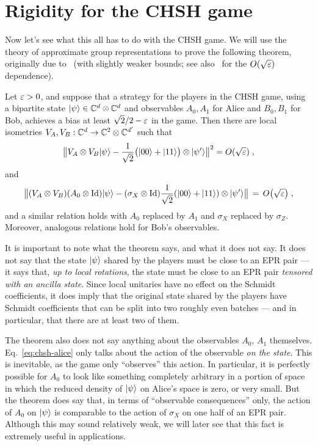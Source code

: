\section{Rigidity for the CHSH game}

Now let's see what this all has to do with the CHSH game. We will use the theory of approximate group representations to prove the following theorem, originally due to~\cite{summers1988maximal} (with slightly weaker bounds; see also~\cite{mckague2012robust} for the $O(\sqrt{\varepsilon})$ dependence).

\begin{theorem}\label{thm:rigid-chsh}
Let $\varepsilon>0$, and suppose that a strategy for the players  in the CHSH game, using  a bipartite state $|\psi\rangle\in\mathbb{C}^d\otimes \mathbb{C}^d$ and observables $A_0,A_1$ for Alice and $B_0,B_1$ for Bob, achieves a bias at least $\sqrt{2}/2-\varepsilon$ in the game. Then there are local isometries $V_A,V_B:\mathbb{C}^d \to \mathbb{C}^2 \otimes \mathbb{C}^{d'}$ such that 
\begin{equation}\label{eq:chsh-state}
\big\| V_A \otimes V_B |\psi\rangle - \frac{1}{\sqrt{2}}\big(|00\rangle+|11\rangle\big) \otimes |\psi'\rangle \big\|^2 = O(\sqrt{\varepsilon}) \;,
\end{equation}
and 
\begin{equation}\label{eq:chsh-alice}
\big\|( V_A \otimes V_B)( A_0 \otimes \mathop{\rm Id}\nolimits )|\psi\rangle - (\sigma_X \otimes \mathop{\rm Id}\nolimits)\frac{1}{\sqrt{2}}(|00\rangle+|11\rangle) \otimes |\psi'\rangle \big\| \,=\, O\big(\sqrt{\varepsilon}\big)\;,
\end{equation}
and a similar relation holds with $A_0$ replaced by $A_1$ and $\sigma_X$ replaced by $\sigma_Z$. Moreover, analogous relations hold for Bob's observables. 
\end{theorem}

It is important to note what the theorem says, and what it does not say. It does not say that the state $|\psi\rangle$ shared by the players must be close to an EPR pair --- it says that, \emph{up to local rotations}, the state must be close to an EPR pair \emph{tensored with an ancilla state}. Since local unitaries have no effect on the Schmidt coefficients, it does imply that the original state shared by the players have Schmidt coefficients that can be split into two roughly even batches --- and in particular, that there are at least two of them. 

 The theorem also does not say anything about the observables $A_0$, $A_1$ themselves. Eq.~\eqref{eq:chsh-alice} only talks about the action of the observable \emph{on the state}. This is inevitable, as the game only ``observes'' this action. In particular, it is perfectly possible for $A_0$ to look like something completely arbitrary in a portion of space in which the reduced density of $|\psi\rangle$ on Alice's space is zero, or very small. But the theorem does say that, in terms of ``observable consequences'' only, the action of $A_0$ on $|\psi\rangle$ is comparable to the action of $\sigma_X$ on one half of an EPR pair. Although this may sound relatively weak, we will later see that this fact is extremely useful in applications. 


